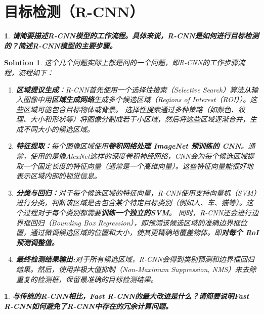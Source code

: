 \documentclass{article}
\theoremstyle{Problem}
\newtheorem{prob}[subsection]{}
\theoremstyle{Solution}
\newtheorem*{sol}{Solution}
\begin{document}
	\newpage
	
	\section{目标检测（R-CNN）}
	
	\begin{prob}
		\textbf{请简要描述R-CNN模型的工作流程。具体来说，R-CNN是如何进行目标检测的？简述R-CNN模型的主要步骤。}
	\end{prob}
		
	\begin{sol}
		这个几个问题实际上都是问的一个问题，即R-CNN的工作步骤流程，流程如下：
		
		\begin{enumerate}
			\item \textbf{区域提议生成}：R-CNN首先使用一个选择性搜索（Selective Search）算法从输入图像中用\textbf{区域生成网络}生成多个候选区域（Regions of Interest（ROI））。这些区域可能包含目标物体或背景。
			选择性搜索通过多种策略（如颜色、纹理、大小和形状等）将图像分割成若干小区域，然后将这些区域逐渐合并，生成不同大小的候选区域。
			
			\item \textbf{特征提取：}每个图像区域使用\textbf{卷积网络处理 ImageNet 预训练的 CNN}。通常，使用的是像AlexNet这样的深度卷积神经网络，CNN会为每个候选区域提取一个固定长度的特征向量（通常是一个高维向量）。这些特征向量能很好地表示区域内部的视觉信息。
			
			\item \textbf{分类与回归：}对于每个候选区域的特征向量，R-CNN使用支持向量机（SVM）进行分类，判断该区域是否包含某个特定目标类别（例如人、车、猫等）。这个过程对于每个类别都需要\textbf{训练一个独立的SVM}。
			同时，R-CNN还会进行边界框回归（Bounding Box Regression），即预测该候选区域的准确边界框位置，通过微调候选区域的位置和大小，使其更精确地覆盖物体。即\textbf{对每个 RoI 预测调整值。}
			
			\item \textbf{最终检测结果输出:}对于所有候选区域，R-CNN会得到类别预测和边界框回归结果。然后，使用非极大值抑制（Non-Maximum Suppression, NMS）来去除重复的检测框，保留最准确的目标检测结果。
		
		\end{enumerate}
	\end{sol}
	
	\begin{prob}
		\textbf{与传统的R-CNN相比，Fast R-CNN的最大改进是什么？请简要说明Fast R-CNN如何避免了R-CNN中存在的冗余计算问题。}\
	\end{prob}
	
\end{document}
